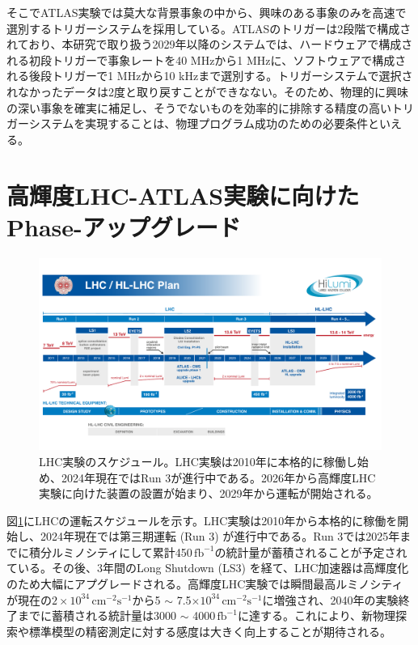 そこでATLAS実験では莫大な背景事象の中から、興味のある事象のみを高速で選別するトリガーシステムを採用している。ATLASのトリガーは2段階で構成されており、本研究で取り扱う2029年以降のシステムでは、ハードウェアで構成される初段トリガーで事象レートを40 MHzから1 MHzに、ソフトウェアで構成される後段トリガーで1 MHzから10 kHzまで選別する。トリガーシステムで選択されなかったデータは2度と取り戻すことができなない。そのため、物理的に興味の深い事象を確実に補足し、そうでないものを効率的に排除する精度の高いトリガーシステムを実現することは、物理プログラム成功のための必要条件といえる。


\section{高輝度LHC-ATLAS実験に向けたPhase-\two アップグレード}
\label{sec_intro_phase2upgrade}

\begin{figure} 
\centering
\includegraphics[width=16cm]{fig/Intro/LHCschedule.pdf}
\caption[LHC実験のスケージュール]{LHC実験のスケジュール\cite{cern_hllhc_industry}。LHC実験は2010年に本格的に稼働し始め、2024年現在ではRun 3が進行中である。2026年から高輝度LHC実験に向けた装置の設置が始まり、2029年から運転が開始される。}
\label{LHCschedule}
\end{figure}

図\ref{LHCschedule}にLHCの運転スケジュールを示す。LHC実験は2010年から本格的に稼働を開始し、2024年現在では第三期運転 (Run 3) が進行中である。Run 3では2025年までに積分ルミノシティにして累計450\,$\mathrm{fb}^{-1}$の統計量が蓄積されることが予定されている。その後、3年間のLong Shutdown (LS3) を経て、LHC加速器は高輝度化のため大幅にアプグレードされる。高輝度LHC実験では瞬間最高ルミノシティが現在の$2\times10^{34}\,\mathrm{cm}^{-2}\mathrm{s}^{-1}$から5 $\sim$ 7.5$\times10^{34}\,\mathrm{cm}^{-2}\mathrm{s}^{-1}$に増強され、2040年の実験終了までに蓄積される統計量は3000  $\sim$ 4000\,$\mathrm{fb}^{-1}$に達する。これにより、新物理探索や標準模型の精密測定に対する感度は大きく向上することが期待される。

